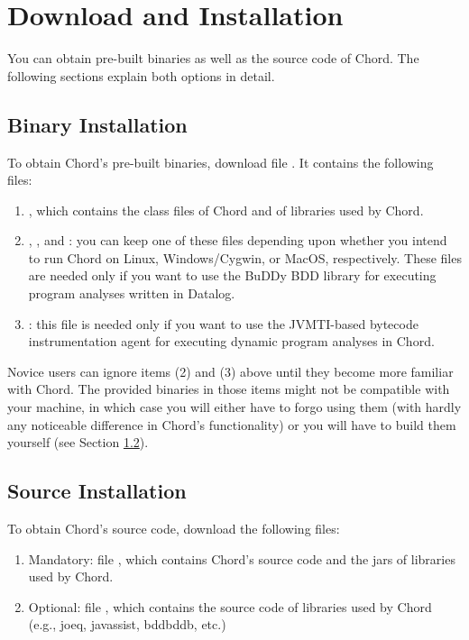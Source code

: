 \section{Download and Installation}
\label{sec:download-and-installation}

You can obtain pre-built binaries as well as the source code of Chord.
The following sections explain both options in detail.

\subsection {Binary Installation}
\label{sec:binary-install}

To obtain Chord's pre-built binaries, download file .
It contains the following files:

\begin{enumerate}
\item
{}, which contains the class files of Chord and of libraries used by Chord.
\item
{}, , and : you can keep one of these files
depending upon whether you intend to run Chord on Linux, Windows/Cygwin, or MacOS, respectively.
These files are needed only if you want to use the BuDDy BDD library for executing program
analyses written in Datalog.
\item
{}: this file is needed only if you want to use the JVMTI-based bytecode
instrumentation agent for executing dynamic program analyses in Chord.
\end{enumerate}

\noindent Novice users can ignore items (2) and (3) above until they become more familiar with Chord.
The provided binaries in those items might not be compatible with your machine, in which case you
will either have to forgo using them (with hardly any noticeable difference in Chord's functionality)
or you will have to build them yourself (see Section \ref{sec:source-install}).

\subsection{Source Installation}
\label{sec:source-install}

To obtain Chord's source code, download the following files:

\begin{enumerate}
\item
Mandatory: file , which contains Chord's source code and the jars of libraries used by Chord.
\item
Optional: file , which contains the source
code of libraries used by Chord (e.g., joeq, javassist, bddbddb, etc.)
\end{enumerate}

